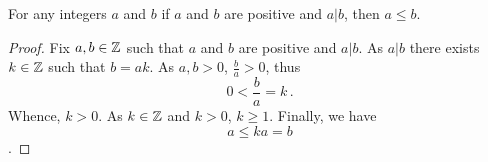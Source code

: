 \guard




\begin{prop}
\label{prop:positiveDividesImpliesNotGreater}
  For any integers $a$ and $b$ if $a$ and $b$ are positive and $a\vert b$, then $a\leq b$.
\end{prop}
\begin{proof}
  Fix $a,b\in\mathbb{Z}$ such that $a$ and $b$ are positive and $a\vert b$.
  As $a\vert b$ there exists $k\in\mathbb{Z}$ such that $b=ak$.
  As $a,b>0$, $\frac{b}{a}>0$, thus \[ 0 < \frac{b}{a}=k\,.\]
  Whence, $k>0$.
  As $k\in\mathbb{Z}$ and $k>0$, $k\geq 1$.
  Finally, we have \[ a \leq ka = b \].
\end{proof}
